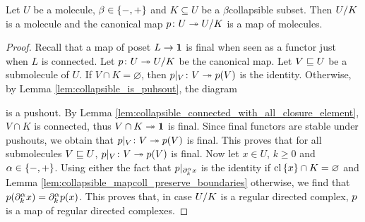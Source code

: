 \begin{prop} \label{prop:collapsible_collapse_to_molecules}
    Let \( U \) be a molecule, \( \beta \in \set{-, +} \) and \( K \subseteq U \) be a \( \beta \)\nbd collapsible subset.
    Then \( \coll{K}{U} \) is a molecule and the canonical map \( \mapcoll \colon U \surj \coll{K}{U} \) is a map of molecules.
\end{prop}
\begin{proof}
    Recall that a map of poset \( L \to \pt \) is final when seen as a functor just when \( L \) is connected. 
    Let \( \mapcoll \colon U \surj \coll{K}{U} \) be the canonical map.
    Let \( V \submol U \) be a submolecule of \( U \). 
    If \( V \cap K = \varnothing \), then \( \restr{\mapcoll}{V} \colon V \surj \mapcoll(V) \) is the identity.
    Otherwise, by Lemma \ref{lem:collapsible_is_puhsout}, the diagram
    \begin{center}
    \end{center}
    is a pushout.
    By Lemma \ref{lem:collapsible_connected_with_all_closure_element}, \( V \cap K \) is connected, thus \( V \cap K \surj \pt \) is final.
    Since final functors are stable under pushouts, we obtain that \( \restr{\mapcoll}{V} \colon V \surj \mapcoll(V) \) is final.
    This proves that for all submolecules \( V \submol U \), \( \restr{\mapcoll}{V} \colon V \surj \mapcoll(V) \) is final.
    Now let \( x \in U \), \( k \geq 0 \) and \( \a \in \set{-, +} \).
    Using either the fact that \( \restr{p}{\bd{k}{\a} x} \) is the identity if \( \clset{x} \cap K = \varnothing \) and Lemma \ref{lem:collapsible_mapcoll_preserve_boundaries} otherwise, we find that \( \mapcoll(\bd{k}{\a} x) = \bd{k}{\a} \mapcoll(x) \).
    This proves that, in case \( \coll{K}{U} \) is a regular directed complex, \( \mapcoll \) is a map of regular directed complexes.


\end{proof}
